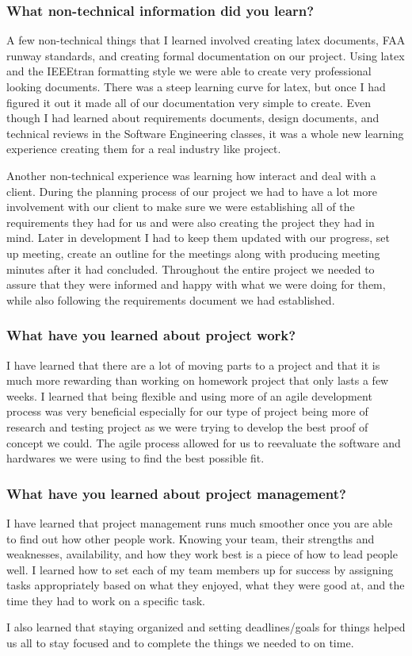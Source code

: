 \subsubsection{What non-technical information did you learn?}
A few non-technical things that I learned involved creating latex documents, FAA runway standards, and creating formal documentation on our project. Using latex and the IEEEtran formatting style we were able to create very professional looking documents. There was a steep learning curve for latex, but once I had figured it out it made all of our documentation very simple to create. Even though I had learned about requirements documents, design documents, and technical reviews in the Software Engineering classes, it was a whole new learning experience creating them for a real industry like project. 
\par
Another non-technical experience was learning how interact and deal with a client. During the planning process of our project we had to have a lot more involvement with our client to make sure we were establishing all of the requirements they had for us and were also creating the project they had in mind. Later in development I had to keep them updated with our progress, set up meeting, create an outline for the meetings along with producing meeting minutes after it had concluded. Throughout the entire project we needed to assure that they were informed and happy with what we were doing for them, while also following the requirements document we had established.\\

\subsubsection{What have you learned about project work?}
I have learned that there are a lot of moving parts to a project and that it is much more rewarding than working on homework project that only lasts a few weeks. I learned that being flexible and using more of an agile development process was very beneficial especially for our type of project being more of research and testing project as we were trying to develop the best proof of concept we could. The agile process allowed for us to reevaluate the software and hardwares we were using to find the best possible fit.\\

\subsubsection{What have you learned about project management?}
I have learned that project management runs much smoother once you are able to find out how other people work. Knowing your team, their strengths and weaknesses, availability, and how they work best is a piece of how to lead people well. I learned how to set each of my team members up for success by assigning tasks appropriately based on what they enjoyed, what they were good at, and the time they had to work on a specific task. 
\par
I also learned that staying organized and setting deadlines/goals for things helped us all to stay focused and to complete the things we needed to on time.\\

